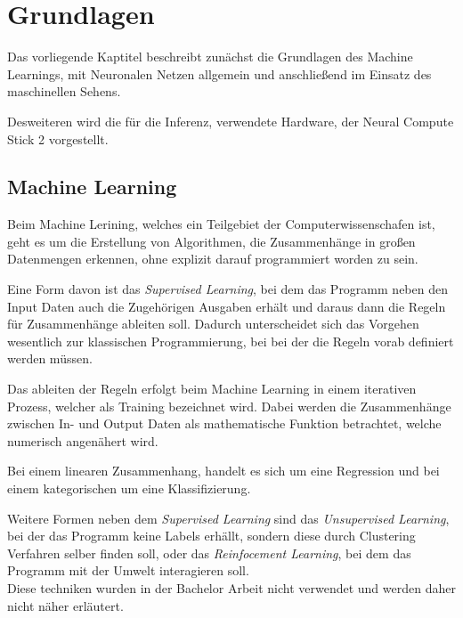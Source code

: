 \chapter{Grundlagen}\label{kap:grundlagen}


Das vorliegende Kaptitel beschreibt zunächst die Grundlagen des Machine 
Learnings, mit Neuronalen Netzen allgemein und anschließend im 
Einsatz des maschinellen Sehens.

Desweiteren wird die für die Inferenz, verwendete Hardware, 
der Neural Compute Stick 2 vorgestellt.



\section{Machine Learning}\label{sec:ml}

Beim Machine Lerining, welches ein Teilgebiet der Computerwissenschafen
ist, geht es um die Erstellung von Algorithmen, die Zusammenhänge in großen
Datenmengen erkennen, ohne explizit darauf programmiert worden zu sein.

Eine Form davon ist das \textit{Supervised Learning}, bei dem das Programm 
neben den Input Daten auch die Zugehörigen Ausgaben erhält und daraus 
dann die Regeln für Zusammenhänge ableiten soll.
Dadurch unterscheidet sich das Vorgehen wesentlich zur klassischen Programmierung,
bei bei der die Regeln vorab definiert werden müssen.

\vspace{0.5cm}
\begin{figure}[htb]
    \centering
    \def\svgwidth{0.8\columnwidth}
    \footnotesize
    
\end{figure}
\vspace{0.5cm}



Das ableiten der Regeln erfolgt beim Machine Learning in einem 
iterativen Prozess, welcher als Training bezeichnet wird.
Dabei werden die Zusammenhänge zwischen In- und Output Daten 
als mathematische Funktion betrachtet, welche numerisch 
angenähert wird.

Bei einem linearen Zusammenhang, handelt es sich
um eine Regression und bei einem kategorischen um 
eine Klassifizierung.


Weitere Formen neben dem \textit{Supervised Learning} sind das 
\textit{Unsupervised Learning}, bei der das Programm keine Labels 
erhällt, sondern diese durch Clustering Verfahren selber finden 
soll, oder das \textit{Reinfocement Learning}, bei dem das Programm 
mit der Umwelt interagieren soll.
\\
Diese techniken wurden in der Bachelor Arbeit nicht verwendet 
und werden daher nicht näher erläutert.

